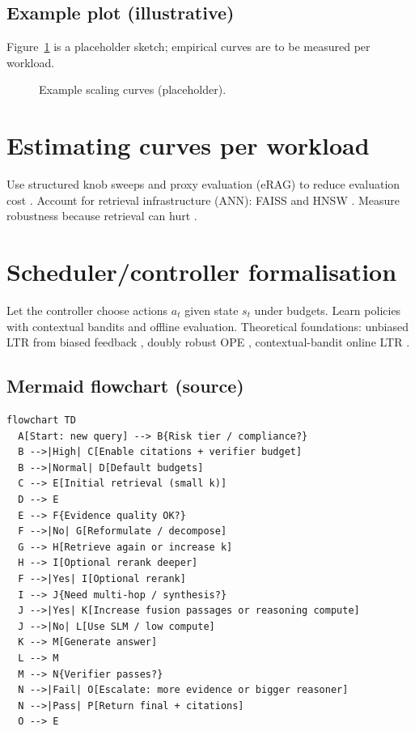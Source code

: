 \documentclass[11pt,a4paper]{article}
\begin{document}
\subsection{Example plot (illustrative)}
Figure~\ref{fig:example-curves} is a placeholder sketch; empirical curves are to be measured per workload.

\begin{figure}[ht]
\centering
\caption{Example scaling curves (placeholder).}
\label{fig:example-curves}
\end{figure}

\section{Estimating curves per workload}
Use structured knob sweeps and proxy evaluation (eRAG) to reduce evaluation cost \cite{Salemi2024ERAG}.
Account for retrieval infrastructure (ANN): FAISS \cite{Johnson2017FAISS} and HNSW \cite{Malkov2016HNSW}.
Measure robustness because retrieval can hurt \cite{Yoran2024RobustRAG}.

\section{Scheduler/controller formalisation}
Let the controller choose actions $a_t$ given state $s_t$ under budgets.
Learn policies with contextual bandits and offline evaluation.
Theoretical foundations: unbiased LTR from biased feedback \cite{Joachims2017UnbiasedLTR},
doubly robust OPE \cite{Dudik2011DoublyRobust,Dudik2014DROptim}, contextual-bandit online LTR \cite{Li2019ContextualBanditLTR}.

\subsection{Mermaid flowchart (source)}
\begin{lstlisting}
flowchart TD
  A[Start: new query] --> B{Risk tier / compliance?}
  B -->|High| C[Enable citations + verifier budget]
  B -->|Normal| D[Default budgets]
  C --> E[Initial retrieval (small k)]
  D --> E
  E --> F{Evidence quality OK?}
  F -->|No| G[Reformulate / decompose]
  G --> H[Retrieve again or increase k]
  H --> I[Optional rerank deeper]
  F -->|Yes| I[Optional rerank]
  I --> J{Need multi-hop / synthesis?}
  J -->|Yes| K[Increase fusion passages or reasoning compute]
  J -->|No| L[Use SLM / low compute]
  K --> M[Generate answer]
  L --> M
  M --> N{Verifier passes?}
  N -->|Fail| O[Escalate: more evidence or bigger reasoner]
  N -->|Pass| P[Return final + citations]
  O --> E
\end{lstlisting}
\end{document}
